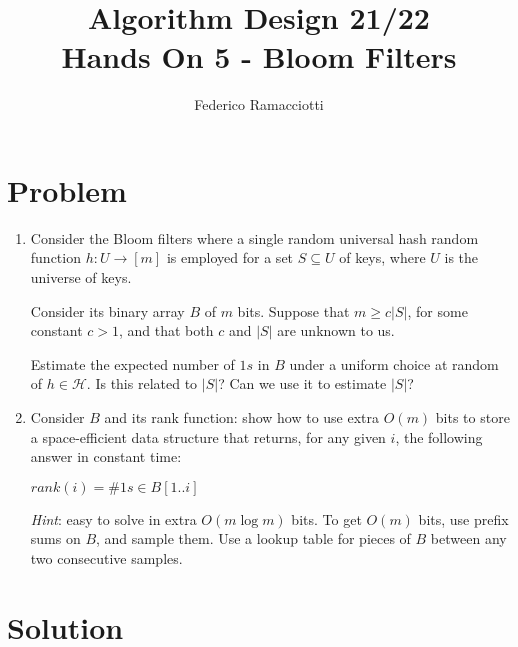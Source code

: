 \documentclass{article}
\title{\LARGE{\textbf{Algorithm Design 21/22}}\\ \vspace{1cm} Hands On 5 - Bloom Filters}
\author{Federico Ramacciotti}
\date{}
\begin{document}
\maketitle

\section{Problem}
\begin{enumerate}
    \item Consider the Bloom filters where a single random universal hash random function $h : U \to [m]$ is employed for a set $S \subseteq U$ of keys, where $U$ is the universe of keys. 
    
    Consider its binary array $B$ of $m$ bits. Suppose that $m \geq c|S|$, for some constant $c > 1$, and that both $c$ and $|S|$ are unknown to us.
    
    Estimate the expected number of $1s$ in $B$ under a uniform choice at random of $h \in \mathcal{H}$. Is this related to $|S|$? Can we use it to estimate $|S|$?
    \item Consider $B$ and its rank function: show how to use extra $O(m)$ bits to store a space-efficient data structure that returns, for any given $i$, the following answer in constant time: 
    
    $rank(i) = \#1s \in B[1..i]$
    
    \textit{Hint}: easy to solve in extra $O(m\log m)$ bits. To get $O(m)$ bits, use prefix sums on $B$, and sample them. Use a lookup table for pieces of $B$ between any two consecutive samples.
\end{enumerate}

\section{Solution}
\end{document}
